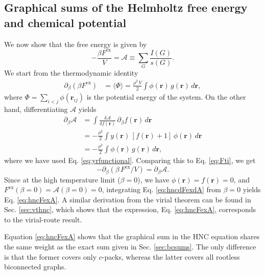 \documentclass[preprint]{revtex4-1}
\newcommand{\vct}[1]{\mathbf{#1}}
\providecommand{\vr}{} %
\renewcommand{\vr}{\vct{r}}
\newcommand{\supex}[1]{ { { #1 }^{ \mathrm{ex} } } }
\newcommand{\Fex}{\supex{F}}
\newcommand{\A}{\mathcal{A}}
\begin{document}
\subsection{\label{sec:hncFex}Graphical sums of the Helmholtz free energy and chemical potential}


We now show that the free energy is given by\cite{morita1958, *morita1960}
\begin{equation}
  -\frac{ \beta \Fex }{V}
=
  \A \equiv \sum_G \frac{ I(G) }{ s(G) }.
\label{eq:hncFexA}
\end{equation}
%
We start from the thermodynamic identity
\begin{align}
  \partial_\beta (\beta \Fex)
&=
 \langle \Phi \rangle
=
\frac{\rho^2 \, V}{2} \int
  \phi(\vr) \, g(\vr) \, d\vr,
  \label{eq:Fti}
\end{align}
where $\Phi = \sum_{i < j} \phi(\vr_{ij})$
is the potential energy of the system.
%
On the other hand, differentiating $\A$ yields
\begin{align*}
  \partial_\beta \A
&=
  \int
  \frac{ \delta \A } { \delta f(\vr) }
  \,
  \partial_\beta f(\vr) \, d\vr
  \\
&=
  -\frac{\rho^2} {2}
  \int
  y(\vr) \, [f(\vr) + 1]
  \, \phi(\vr) \, d\vr
  \\
&=
  -\frac{\rho^2} {2}
  \int \phi(\vr) \, g(\vr) \, d\vr,
\end{align*}
where we have used Eq. \eqref{eq:yrfunctional}.
%
Comparing this to Eq. \eqref{eq:Fti}, we get
\begin{equation}
  -\partial_\beta(\beta \, \Fex/V) = \partial_\beta \A.
  \label{eq:hncdFexdA}
\end{equation}
Since at the high temperature limit ($\beta = 0$),
we have $\phi(\vr) = f(\vr) = 0$,
and $\Fex(\beta = 0) = \A(\beta = 0) = 0$,
%
integrating Eq. \eqref{eq:hncdFexdA} from $\beta = 0$
yields Eq. \eqref{eq:hncFexA}.
%
A similar derivation from the virial theorem
can be found in Sec. \ref{sec:vthnc},
which shows that the expression, Eq. \eqref{eq:hncFexA},
corresponds to the virial-route result\cite{morita1960, morita1960I}.

Equation \eqref{eq:hncFexA} shows that the graphical sum
in the HNC equation shares the same weight as
the exact sum given in Sec. \ref{sec:bcsums}.
%
The only difference is that the former covers only $c$-packs,
whereas the latter covers all rootless biconnected graphs.
\end{document}
